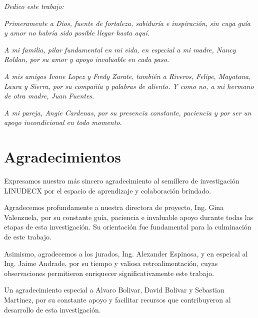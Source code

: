 \documentclass[12pt,openright,oneside]{book}
\begin{document}
\begin{center}
\textit{Dedico este trabajo:}

\vspace{0.5cm}

\textit{Primeramente a Dios, fuente de fortaleza, sabiduría e inspiración,}  
\textit{sin cuya guía y amor no habría sido posible llegar hasta aquí.}

\vspace{0.5cm}

\textit{A mi familia, pilar fundamental en mi vida,}  
\textit{en especial a mi madre, Nancy Roldan,}  
\textit{por su amor y apoyo invaluable en cada paso.}

\vspace{0.5cm}

\textit{A mis amigos Ivone Lopez y Fredy Zarate,}
\textit{también a Riveros, Felipe, Mayatana, Laura y Sierra,}
\textit{por su compañía y palabras de aliento.}
\textit{Y como no, a mi hermano de otra madre, Juan Fuentes.}

\vspace{0.5cm}

\textit{A mi pareja, Angie Cardenas,}  
\textit{por su presencia constante, paciencia y por ser}  
\textit{un apoyo incondicional en todo momento.}
\end{center}
\vspace*{\fill}



\chapter*{Agradecimientos}
Expresamos nuestro más sincero agradecimiento al semillero de investigación LINUDECX por el espacio de aprendizaje y colaboración brindado.

Agradecemos profundamente a nuestra directora de proyecto, Ing. Gina Valenzuela, por su constante guía, paciencia e invaluable apoyo durante todas las etapas de esta investigación. Su orientación fue fundamental para la culminación de este trabajo.

Asimismo, agradecemos a los jurados, Ing. Alexander Espinosa, y en espeical al Ing. Jaime Andrade, por su tiempo y valiosa retroalimentación, cuyas observaciones permitieron enriquecer significativamente este trabajo.

Un agradecimiento especial a Alvaro Bolivar, David Bolivar y Sebastian Martinez, por su constante apoyo y facilitar recursos que contribuyeron al desarrollo de esta investigación.
\end{document}
